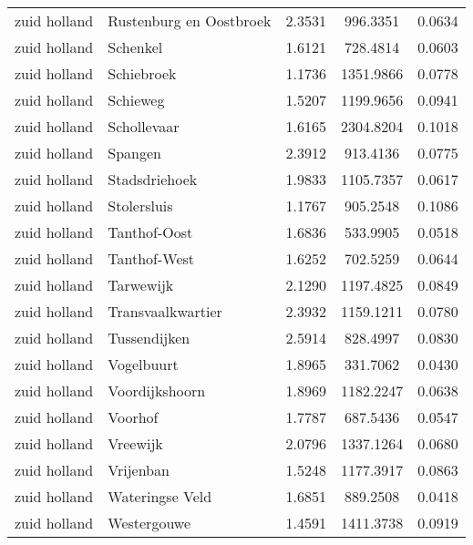 \begin{longtable}{llccc}
	zuid holland  & Rustenburg en Oostbroek          & 2.3531  & 996.3351  & 0.0634          \\
	zuid holland  & Schenkel                         & 1.6121  & 728.4814  & 0.0603          \\
	zuid holland  & Schiebroek                       & 1.1736  & 1351.9866 & 0.0778          \\
	zuid holland  & Schieweg                         & 1.5207  & 1199.9656 & 0.0941          \\
	zuid holland  & Schollevaar                      & 1.6165  & 2304.8204 & 0.1018          \\
	zuid holland  & Spangen                          & 2.3912  & 913.4136  & 0.0775          \\
	zuid holland  & Stadsdriehoek                    & 1.9833  & 1105.7357 & 0.0617          \\
	zuid holland  & Stolersluis                      & 1.1767  & 905.2548  & 0.1086          \\
	zuid holland  & Tanthof-Oost                     & 1.6836  & 533.9905  & 0.0518          \\
	zuid holland  & Tanthof-West                     & 1.6252  & 702.5259  & 0.0644          \\
	zuid holland  & Tarwewijk                        & 2.1290  & 1197.4825 & 0.0849          \\
	zuid holland  & Transvaalkwartier                & 2.3932  & 1159.1211 & 0.0780          \\
	zuid holland  & Tussendijken                     & 2.5914  & 828.4997  & 0.0830          \\
	zuid holland  & Vogelbuurt                       & 1.8965  & 331.7062  & 0.0430          \\
	zuid holland  & Voordijkshoorn                   & 1.8969  & 1182.2247 & 0.0638          \\
	zuid holland  & Voorhof                          & 1.7787  & 687.5436  & 0.0547          \\
	zuid holland  & Vreewijk                         & 2.0796  & 1337.1264 & 0.0680          \\
	zuid holland  & Vrijenban                        & 1.5248  & 1177.3917 & 0.0863          \\
	zuid holland  & Wateringse Veld                  & 1.6851  & 889.2508  & 0.0418          \\
	zuid holland  & Westergouwe                      & 1.4591  & 1411.3738 & 0.0919          \\

\end{longtable}
